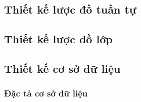 \subsection{Thiết kế lược đồ tuần tự}
\label{subsec:tuantu}

\subsection{Thiết kế lược đồ lớp}

\subsection{Thiết kế cơ sở dữ liệu}
\label{sec:csdl}

\subsubsection*{Đặc tả cơ sở dữ liệu}
\label{subsec:dacta-csdl}

